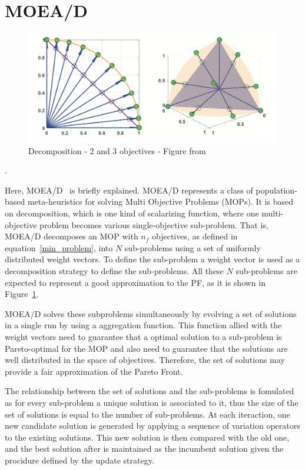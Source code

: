 
\section{MOEA/D}\label{sec:background} 

\begin{figure}[!t]\label{decomp-example}
	\centering
	\includegraphics[width=\textwidth]{images/decomp2.png}
	\caption{Decomposition  -  2 and 3 objectives - Figure from \cite{chugh2017handling} }
\end{figure}.

Here, MOEA/D~\cite{zhang2007moea} is briefly explained. MOEA/D represents a class of population-based meta-heuristics for solving Multi Objective Problems (MOPs). It is based on decomposition, which is one kind of scalarizing function, where one multi-objective problem becomes various single-objective sub-problem. That is, MOEA/D decomposes an MOP with $n_f$ objectives, as defined in equation~\ref{min_problem}, into $N$  sub-problems using a set of uniformly distributed weight vectors. To define the sub-problem a weight vector is used as a decomposition strategy to  define the sub-problems.  All these $N$ sub-problems are expected to represent a good approximation to the PF, as it is shown in Figure~\ref{decomp-example}.

MOEA/D solves these subproblems simultaneously by evolving a set of solutions in a single run by using a aggregation function. This function allied with the weight vectors need to guarantee that a optimal solution to a sub-problem is Pareto-optimal for the MOP and also need to guarantee that the solutions are well distributed in the space of objectives. Therefore, the set of solutions may provide a fair approximation of the Pareto Front.

The relationship between the set of solutions and the sub-problems is fomulated as for every sub-problem a unique solution is associated to it, thus the size of the set of solutions is equal to the number of sub-problems.  At each iteraction, one new candidate solution is generated by applying a sequence of variation operators to the existing solutions. This new solution is then compared with the old one, and the best solution after is maintained as the incumbent solution given the procidure defined by the update strategy.

